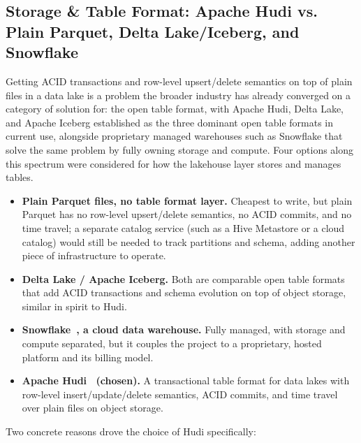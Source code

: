 \subsection{Storage \& Table Format: Apache Hudi vs. Plain Parquet, Delta Lake/Iceberg, and Snowflake}
\label{sec:storage-format}

Getting ACID transactions and row-level upsert/delete semantics on top of plain files in a data lake is a problem the broader industry has already converged on a category of solution for: the open table format, with Apache Hudi, Delta Lake, and Apache Iceberg established as the three dominant open table formats in current use, alongside proprietary managed warehouses such as Snowflake that solve the same problem by fully owning storage and compute. Four options along this spectrum were considered for how the lakehouse layer stores and manages tables.

\begin{itemize}
    \item \textbf{Plain Parquet files, no table format layer.} Cheapest to write, but plain Parquet has no row-level upsert/delete semantics, no ACID commits, and no time travel; a separate catalog service (such as a Hive Metastore or a cloud catalog) would still be needed to track partitions and schema, adding another piece of infrastructure to operate.
    \item \textbf{Delta Lake / Apache Iceberg.} Both are comparable open table formats that add ACID transactions and schema evolution on top of object storage, similar in spirit to Hudi.
    \item \textbf{Snowflake~\cite{snowflake}, a cloud data warehouse.} Fully managed, with storage and compute separated, but it couples the project to a proprietary, hosted platform and its billing model.
    \item \textbf{Apache Hudi~\cite{hudi} (chosen).} A transactional table format for data lakes with row-level insert/update/delete semantics, ACID commits, and time travel over plain files on object storage.
\end{itemize}

Two concrete reasons drove the choice of Hudi specifically:

